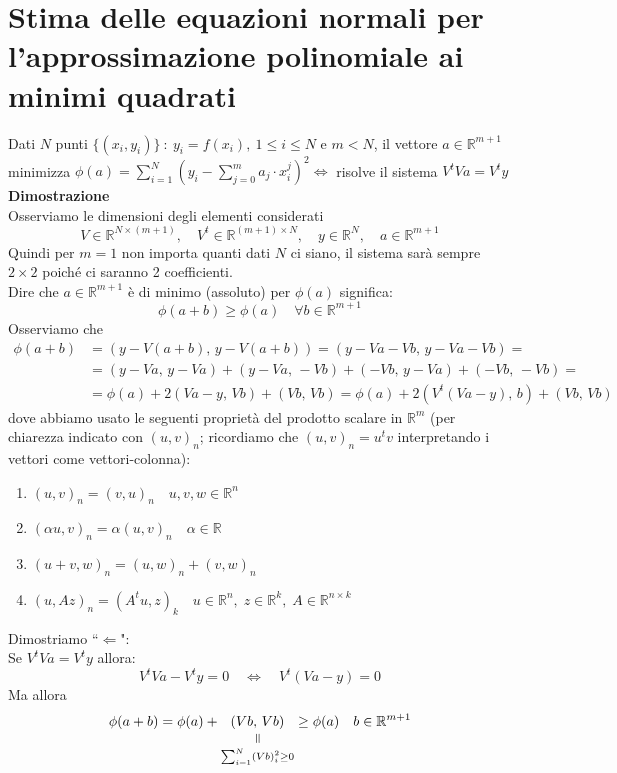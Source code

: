 \section{Stima delle equazioni normali per l'approssimazione polinomiale ai minimi quadrati}
Dati $N$ punti $\{ (x_i, y_i) \}\ : \ y_i = f(x_i), \ 1 \leq i \leq N$ e $m < N$, il vettore $a \in \mathbb{R}^{m+1}$\\
minimizza $\phi(a) = \sum\limits_{i=1}^N (y_i - \sum\limits_{j=0}^m a_j \cdot x_i^j)^2 \iff $ risolve il sistema $V^t Va = V^t y$\\
\textbf{Dimostrazione}\\
Osserviamo le dimensioni degli elementi considerati
\[
V \in \mathbb{R}^{N \times (m+1)}, \quad V^t \in \mathbb{R}^{(m+1) \times N}, \quad y \in \mathbb{R}^{N}, \quad a \in \mathbb{R}^{m+1}
\]
Quindi per $m=1$ non importa quanti dati $N$ ci siano, il sistema sarà sempre $2\times2$ poiché ci saranno 2 coefficienti.\\
Dire che $a \in \mathbb{R}^{m+1}$ è di minimo (assoluto) per $\phi(a)$ significa:
\[
\phi(a+b) \geq \phi(a) \quad \forall b \in \mathbb{R}^{m+1}
\]
Osserviamo che
\[ \begin{split}
\phi(a+b) & = (y-V(a+b),\, y-V(a+b)) = 
(y-Va-Vb, \, y-Va-Vb) = \\
& = (y-Va,\, y-Va) + (y-Va, \, -Vb) + (-Vb, \, y-Va) + (-Vb, \, -Vb) = \\
& = \phi(a) + 2(Va-y, \, Vb) + (Vb, \, Vb) = \phi(a) +2(V^t(Va-y), \, b) + (Vb, \, Vb)
\end{split} \]
dove abbiamo usato le seguenti proprietà del prodotto scalare in $\mathbb{R}^{m}$ (per chiarezza indicato con $(u,v)_n$; ricordiamo che $(u,v)_n=u^tv$ interpretando i vettori come vettori-colonna):
\begin{enumerate}
	\item $(u,v)_n=(v,u)_n \quad u,v,w \in \mathbb{R}^{n}$
	\item $(\alpha u,v)_n= \alpha(u,v)_n \quad \alpha \in \mathbb{R}$
	\item $(u+v,w)_n=(u,w)_n+(v,w)_n$
	\item $(u,Az)_n = (A^tu,z)_k \quad u \in \mathbb{R}^{n}, \; z \in \mathbb{R}^{k}, \; A \in \mathbb{R}^{n \times k}$
\end{enumerate}
Dimostriamo ``$\Leftarrow$":\\
 Se $V^t Va=V^t y$ allora:
\[
V^tVa-V^ty=0 \quad \iff \quad V^t(Va-y)=0\]
Ma allora
\[ \begin{split}
\phi(a+b)=\phi(a)+ \equalto{(Vb,\, Vb)}{\sum_{i=1}^{N}(Vb)_i^2 \geq 0} \geq \phi(a) \quad b \in \mathbb{R}^{m+1}
\end{split} \]
